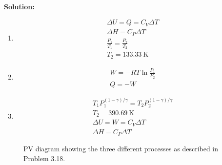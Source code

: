 \documentclass{article}
\newcommand*\widefbox[1]{\fbox{\vspace{0.5em}\hspace{2em}#1\hspace{2em}\vspace{0.5em}}}
\newenvironment{solution}{\par\noindent\textbf{\\Solution:\\}}{\par\medskip}
\begin{document}
\begin{solution}
  \begin{enumerate}[label=(\alph*)]
    \item
      \begin{gather*}
        \Delta U=Q=C_{V}\Delta T\\
        \Delta H=C_{P}\Delta T\\
        \frac{P_{1}}{T_{1}}=\frac{P_{2}}{T_{2}}\\
        T_{2}=133.33~\unit{ \kelvin }
      \end{gather*}
    \item
      \begin{gather*}
        W=-RT\ln\frac{P_{1}}{P_{2}}\\
        Q=-W
      \end{gather*}
    \item
      \begin{gather*}
        T_{1}P_{1}^{\left( 1-\gamma  \right)/\gamma
        }=T_{2}P_{2}^{\left( 1-\gamma  \right)/\gamma }\\
        T_{2}=390.69~\unit{ \kelvin }\\
        \Delta U=W=C_{V}\Delta T\\
        \Delta H=C_{P}\Delta T
      \end{gather*}
  \end{enumerate}
  \begin{figure}[h!]
    \centering
    \scalebox{0.5}{}
    \caption{PV diagram showing the three different processes as
    described in Problem 3.18.}
    \label{fig:s18}
  \end{figure}
\end{solution}
\end{document}
